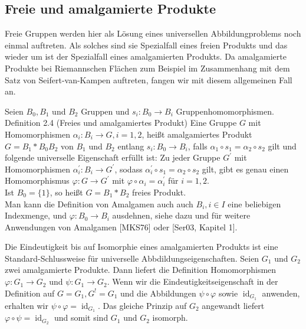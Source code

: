 \documentclass[10pt, letterpaper]{article}
\begin{document}
\subsection {Freie und amalgamierte Produkte}
Freie Gruppen werden hier als Lösung eines universellen Abbildungproblems noch einmal auftreten. Als solches sind sie Spezialfall eines freien Produkts und das wieder um ist der Spezialfall eines amalgamierten Produkts. Da amalgamierte Produkte bei Riemannschen Flächen zum Beispiel im Zusammenhang mit dem Satz von Seifert-van-Kampen auftreten, fangen wir mit diesem allgemeinen Fall an.

Seien $B_{0}, B_{1}$ und $B_{2}$ Gruppen und $s_{i}: B_{0} \rightarrow B_{i}$ Gruppenhomomorphismen.\\
Definition 2.4 (Freies und amalgamiertes Produkt) Eine Gruppe $G$ mit Homomorphismen $\alpha_{i}: B_{i} \rightarrow G, i=1,2$, heißt amalgamiertes Produkt $G=B_{1} * B_{0} B_{2}$ von $B_{1}$ und $B_{2}$ entlang $s_{i}: B_{0} \rightarrow B_{i}$, falls $\alpha_{1} \circ s_{1}=\alpha_{2} \circ s_{2}$ gilt und folgende universelle Eigenschaft erfüllt ist: Zu jeder Gruppe $G^{\prime}$ mit Homomorphismen $\alpha_{i}^{\prime}: B_{i} \rightarrow G^{\prime}$, sodass $\alpha_{i}^{\prime} \circ s_{1}=\alpha_{2} \circ s_{2}$ gilt, gibt es genau einen Homomorphismus $\varphi: G \rightarrow G^{\prime}$ mit $\varphi \circ \alpha_{i}=\alpha_{i}^{\prime}$ für $i=1,2$.\\
Ist $B_{0}=\{1\}$, so heißt $G=B_{1} * B_{2}$ freies Produkt.\\
Man kann die Definition von Amalgamen auch auch $B_{i}, i \in I$ eine beliebigen Indexmenge, und $\varphi: B_{0} \rightarrow B_{i}$ ausdehnen, siehe dazu und für weitere Anwendungen von Amalgamen [MKS76] oder [Ser03, Kapitel 1].

Die Eindeutigkeit bis auf Isomorphie eines amalgamierten Produkts ist eine Standard-Schlussweise für universelle Abbdildungseigenschaften. Seien $G_{1}$ und $G_{2}$ zwei amalgamierte Produkte. Dann liefert die Definition Homomorphismen $\varphi: G_{1} \rightarrow G_{2}$ und $\psi: G_{1} \rightarrow G_{2}$. Wenn wir die Eindeutigkeitseigenschaft in der Definition auf $G=G_{1}, G^{!}=G_{1}$ und die Abbildungen $\psi \circ \varphi$ sowie $\operatorname{id}_{G_{1}}$ anwenden, erhalten wir $\psi \circ \varphi=\operatorname{id}_{G_{1}}$. Das gleiche Prinzip auf $G_{2}$ angewandt liefert $\varphi \circ \psi=\operatorname{id}_{G_{2}}$ und somit sind $G_{1}$ und $G_{2}$ isomorph.
\end{document}
